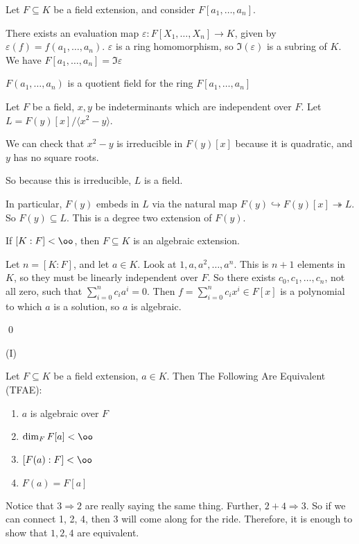 \documentclass[x11names,reqno,14pt]{extarticle}
\newcommand{\into}{\hookrightarrow}
\newcommand{\onto}{\twoheadrightarrow}
\begin{document}
Let $F \subseteq K$ be a field extension, and consider $F[a_1,\dots, a_n]$. 

There exists an evaluation map $\varepsilon:F[X_1,\dots, X_n] \to K$, given by $\varepsilon(f) = f(a_1, \dots, a_n)$. $\varepsilon$ is a ring homomorphism, so $\Im(\varepsilon)$ is a subring of $K$. We have $F[a_1,\dots, a_n] = \Im\varepsilon$

$F(a_1,\dots, a_n)$ is a quotient field for the ring $F[a_1,\dots, a_n]$

Let $F$ be a field, $x, y$ be indeterminants which are independent over $F$. Let $L = F(y)[x]/\langle x^2 - y \rangle$. 

We can check that $x^2 - y$ is irreducible in $F(y)[x]$ because it is quadratic, and $y$ has no square roots. 

So because this is irreducible, $L$ is a field.

In particular, $F(y)$ embeds in $L$ via the natural map $F(y) \into F(y)[x] \onto L$. So $F(y) \subseteq L$. This is a degree two extension of $F(y)$.

\prop

If $[K:F]<\oo$, then $F \subseteq K$ is an algebraic extension.

\proof

Let $n = [K:F]$, and let $a \in K$. Look at $1, a, a^2, \dots, a^n$. This is $n + 1$ elements in $K$, so they must be linearly independent over $F$. So there exists $c_0,c_1,\dots,c_n$, not all zero, such that $\sum_{i=0}^nc_ia^i = 0$. Then $f = \sum_{i=0}^nc_ix^i\in F[x]$ is a polynomial to which $a$ is a solution, so $a$ is algebraic.

\qed

\thm (I)

Let $F \subseteq K$ be a field extension, $a \in K$. Then The Following Are Equivalent (TFAE):

\begin{enumerate}

\item $a$ is algebraic over $F$

\item $\dim_FF[a]<\oo$

\item $[F(a):F] < \oo$

\item $F(a) = F[a]$

\end{enumerate}

\proof

Notice that $3\Rightarrow 2$ are really saying the same thing. Further, $2 + 4 \Rightarrow 3$. So if we can connect 1, 2, 4, then 3 will come along for the ride. Therefore, it is enough to show that $1, 2, 4$ are equivalent.
\end{document}
